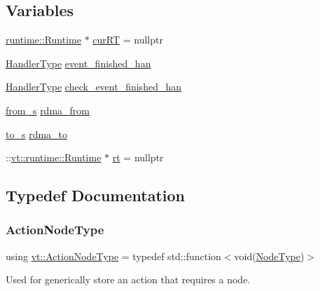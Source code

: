 \subsection*{Variables}
\begin{DoxyCompactItemize}
\item 
\hyperlink{structvt_1_1runtime_1_1_runtime}{runtime\+::\+Runtime} $\ast$ \hyperlink{namespacevt_a07abc8f1752a784f54c226bbc4c3b1fe}{cur\+RT} = nullptr
\item 
\hyperlink{namespacevt_af64846b57dfcaf104da3ef6967917573}{Handler\+Type} \hyperlink{namespacevt_a570bc5403031e45a957476ffae6f67c1}{event\+\_\+finished\+\_\+han}
\item 
\hyperlink{namespacevt_af64846b57dfcaf104da3ef6967917573}{Handler\+Type} \hyperlink{namespacevt_a9764c5fa4f463d23a7db5d56cc121881}{check\+\_\+event\+\_\+finished\+\_\+han}
\item 
\hyperlink{structvt_1_1from__s}{from\+\_\+s} \hyperlink{namespacevt_ae446ed1f5bb8bba34af5c747ea1f244d}{rdma\+\_\+from}
\item 
\hyperlink{structvt_1_1to__s}{to\+\_\+s} \hyperlink{namespacevt_a627aea388cdbf2818bf1393dca90938e}{rdma\+\_\+to}
\item 
\+::\hyperlink{structvt_1_1runtime_1_1_runtime}{vt\+::runtime\+::\+Runtime} $\ast$ \hyperlink{namespacevt_acce65ec10b513659274e722365aaa36d}{rt} = nullptr
\end{DoxyCompactItemize}


\subsection{Typedef Documentation}
\mbox{\label{namespacevt_a0436cb2d620dcbb21b5b49cd9c9c4749}} 
\subsubsection{\texorpdfstring{Action\+Node\+Type}{ActionNodeType}}
{\footnotesize\ttfamily using \hyperlink{namespacevt_a0436cb2d620dcbb21b5b49cd9c9c4749}{vt\+::\+Action\+Node\+Type} = typedef std\+::function$<$void(\hyperlink{namespacevt_a866da9d0efc19c0a1ce79e9e492f47e2}{Node\+Type})$>$}



Used for generically store an action that requires a node. 

\mbox{\label{namespacevt_a102aa105d64254d89f7e585d106c95aa}} 
